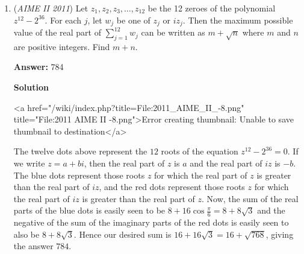 \begin{enumerate}
 The marbles such that the marble to their right has the same color is every marble in a blob but the last, which is 
 \[\sum_{i=1}^{n} (s_i - 1) = \left(\sum_{i=1}^{n} s_i\right) - n = m + 5 - n.\]

 


 Equating our two expression $n-1 = m+5-n \rightarrow 2n=m+6.$

 
Solving for \( n \), we get \( n = \frac{m}{2} + 3 \).  

 Notice that \( n \leq 11 \) because the "best-case scenario" is that each \( G \) forms its own blob, and there is a red blob in between any two \( G \)'s and a red blob on both ends.  Here is how it should look:  

 <red blob> G <red blob> G <red blob> G <red blob> G <red blob> G <red blob>.

 
In this case, there are \( 11 \) blobs.  

 Thus, \( \frac{m}{2} + 3 \leq 11 \implies m \leq 16 \).  

 This is now a stars and bars problem. For \( m = 16 \), we need to create the optimal solution: \( 11 \) blobs.  Since every <red blob> must have at least one red marble, we can just give each blob one red at the start, leaving us with \( 16-6 = 10 \) red marbles left to separate into \( 6 \) groups.  By stars and bars, this is \( \binom{15}{5} = 3003 \).  

 Thus, the answer is \( \boxed{003} \).

 


	\item (\textit{AIME II 2011}) Let $z_1,z_2,z_3,\dots,z_{12}$ be the 12 zeroes of the polynomial $z^{12}-2^{36}$. For each $j$, let $w_j$ be one of $z_j$ or $i z_j$. Then the maximum possible value of the real part of $\sum_{j=1}^{12} w_j$ can be written as $m+\sqrt{n}$ where $m$ and $n$ are positive integers. Find $m+n$.


 
 \textbf{Answer: }784



\textbf{Solution}

<a href="/wiki/index.php?title=File:2011\_AIME\_II\_-8.png" title="File:2011 AIME II -8.png">Error creating thumbnail: Unable to save thumbnail to destination</a>

 The twelve dots above represent the $12$ roots of the equation $z^{12}-2^{36}=0$. If we write $z=a+bi$, then the real part of $z$ is $a$ and the real part of $iz$ is $-b$. The blue dots represent those roots $z$ for which the real part of $z$ is greater than the real part of $iz$, and the red dots represent those roots $z$ for which the real part of $iz$ is greater than the real part of $z$. Now, the sum of the real parts of the blue dots is easily seen to be $8+16\cos\frac{\pi}{6}=8+8\sqrt{3}$ and the negative of the sum of the imaginary parts of the red dots is easily seen to also be $8+8\sqrt{3}$. Hence our desired sum is $16+16\sqrt{3}=16+\sqrt{768}$, giving the answer $\boxed{784}.$





\end{enumerate}
